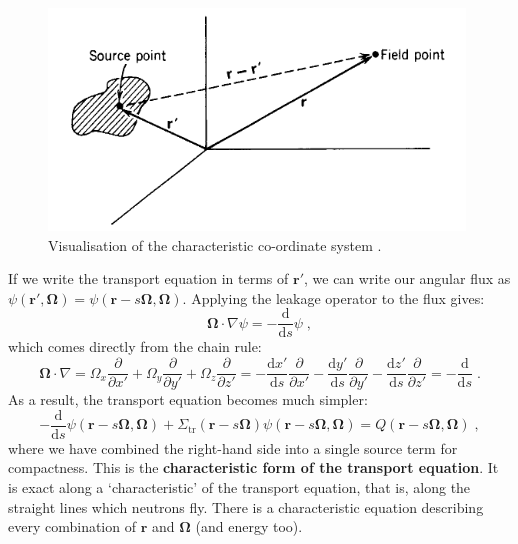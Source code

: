 \documentclass{article}
\begin{document}
\begin{figure}[h]
    \centering
    \includegraphics[width=0.6\linewidth]{integral_coordinates.png}
    \caption{Visualisation of the characteristic co-ordinate system \cite{Duderstadt}.}
    \label{fig:integral}
\end{figure}
If we write the transport equation in terms of $\mathbf{r}'$, we can write our angular flux as $\psi(\mathbf{r}',\mathbf{\Omega})=\psi(\mathbf{r}-s\mathbf{\Omega},\mathbf{\Omega})$. Applying the leakage operator to the flux gives:
\begin{equation}
    \mathbf{\Omega}\cdot\nabla \psi = -\frac{\mathrm{d}}{\mathrm{d}s}\psi\;\mathrm{,}
\end{equation}
which comes directly from the chain rule:
\begin{equation}
    \mathbf{\Omega}\cdot\nabla =\Omega_x\frac{\partial}{\partial x'} + \Omega_y\frac{\partial}{\partial y'} + \Omega_z\frac{\partial}{\partial z'} = -\frac{\mathrm{d}x'}{\mathrm{d}s}\frac{\partial}{\partial x'} - \frac{\mathrm{d}y'}{\mathrm{d}s}\frac{\partial}{\partial y'} - \frac{\mathrm{d}z'}{\mathrm{d}s}\frac{\partial}{\partial z'} = -\frac{\mathrm{d}}{\mathrm{d}s}\;\mathrm{.}
\end{equation}
As a result, the transport equation becomes much simpler:
\begin{equation}\label{eq:back_characteristic}
    -\frac{\mathrm{d}}{\mathrm{d}s}\psi(\mathbf{r}-s\mathbf{\Omega},\mathbf{\Omega}) + \Sigma_\mathrm{tr}(\mathbf{r}-s\mathbf{\Omega})\psi(\mathbf{r}-s\mathbf{\Omega},\mathbf{\Omega}) = Q(\mathbf{r}-s\mathbf{\Omega},\mathbf{\Omega})\;\mathrm{,}
\end{equation}
where we have combined the right-hand side into a single source term for compactness. This is the \textbf{characteristic form of the transport equation}. It is exact along a `characteristic' of the transport equation, that is, along the straight lines which neutrons fly. There is a characteristic equation describing every combination of $\mathbf{r}$ and $\mathbf{\Omega}$ (and energy too).
\end{document}
